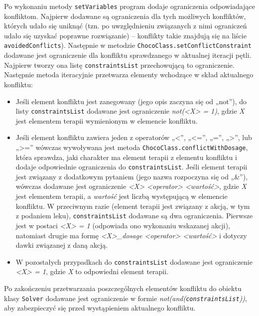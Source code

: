 Po wykonaniu metody \texttt{setVariables} program dodaje ograniczenia odpowiadające konfliktom. 
Najpierw dodawane są ograniczenia dla tych możliwych konfliktów, których udało się uniknąć (tzn. po uwzględnieniu związanych z nimi ograniczeń udało się uzyskać poprawne rozwiązanie) -- konflikty takie znajdują się na liście \texttt{avoidedConflicts}). Następnie w metodzie \texttt{ChocoClass.set\-ConflictConstraint} dodawane jest ograniczenie dla konfliktu sprawdzanego w aktualnej iteracji pętli. Najpierw tworzy ona listę \texttt{constraintsList} przechowującą to ograniczenie. Następnie metoda iteracyjnie przetwarza elementy wchodzące w skład aktualnego konfliktu:
\begin{itemize}
\item Jeśli element konfliktu jest zanegowany (jego opis zaczyna się od „not”), do listy \texttt{constraints\-List} dodawane jest ograniczenie \textit{not(<X> = 1)}, gdzie \textit{X} jest elementem terapii wymienionym w elemencie konfliktu. 
\item Jeśli element konfliktu zawiera jeden z operatorów „<”, „<=”, „=”, „>”, lub „>=” wówczas wywoływana jest metoda \texttt{ChocoClass.conflictWithDosage}, która sprawdza, jaki charakter ma element terapii z elementu konfliktu i dodaje odpowiednie ograniczenia do \texttt{constraints\-List}. Jeśli element terapii jest związany z dodatkowym pytaniem (jego nazwa rozpoczyna się od „\&”), wówczas dodawane jest ograniczenie \textit{<X> <operator> <wartość>}, gdzie \textit{X} jest elementem terapii, a \textit{wartość} jest liczbą występującą w elemencie konfliktu. W przeciwnym razie (element terapii jest związany z akcją, w tym z podaniem leku), \texttt{constraintsList} dodawane są dwa ograniczenia. Pierwsze jest w postaci \textit{<X> = 1} (odpowiada ono wykonaniu wskazanej akcji), natomiast drugie ma formę \textit{<X>\_dosage <operator> <wartość>} i dotyczy dawki związanej z daną akcją. 
\item W pozostałych przypadkach do \texttt{constraintsList} dodawane jest ograniczenie \textit{<X> = 1}, gdzie \textit{X} to odpowiedni element terapii.
\end{itemize}

Po zakończeniu przetwarzania poszczególnych elementów konfliktu do obiektu klasy \texttt{Solver} dodawane jest ograniczenie w formie \textit{not(and(\texttt{constraintsList}))}, aby zabezpieczyć się przed wystąpieniem aktualnego konfliktu.

